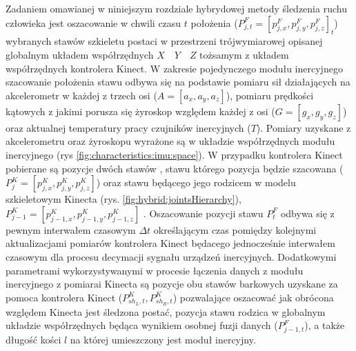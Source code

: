 Zadaniem omawianej w niniejszym rozdziale hybrydowej metody śledzenia ruchu człowieka jest oszacowanie w chwili czasu $t$ położenia ($P^F_{j,t} = [p^F_{j,x}, p^F_{j,y}, p^F_{j,z}]_t$)  wybranych stawów szkieletu postaci w przestrzeni trójwymiarowej opisanej globalnym układem współrzędnych $X\quad Y\quad Z$ tożsamym z układem współrzędnych kontrolera Kinect.
W zakresie pojedynczego modułu inercyjnego szacowanie położenia stawu odbywa się na podstawie pomiaru sił działających na akcelerometr w każdej z trzech osi 
($A = [a_x, a_y, a_z]$), pomiaru prędkości kątowych z jakimi porusza się żyroskop względem każdej z osi 
($G = [g_x, g_y, g_z]$) oraz aktualnej temperatury pracy czujników inercyjnych ($T$). Pomiary uzyskane z akcelerometru oraz żyroskopu wyrażone są w układzie współrzędnych modułu inercyjnego (rys \ref{fig:characteristics:imu:space}). W przypadku kontrolera Kinect pobierane są pozycje dwóch stawów 
, stawu którego pozycja będzie szacowana ($P^K_{j} = [p^K_{j,x}, p^K_{j,y}, p^K_{j,z}]$) oraz stawu będącego jego rodzicem w modelu szkieletowym Kinecta (rys. \ref{fig:hybrid:jointsHierarchy}), $P^K_{j-1} = [p^K_{j-1,x},p^K_{j-1,y}, p^K_{j-1,z}]$ 
. Oszacowanie pozycji stawu $P^F_t$ odbywa się z pewnym interwałem czasowym $\Delta t$ określającym czas pomiędzy kolejnymi aktualizacjami pomiarów kontrolera Kinect będacego jednocześnie interwałem czasowym dla procesu decymacji sygnału urządzeń inercyjnych. Dodatkowymi parametrami wykorzystywanymi w procesie łączenia danych z modułu inercyjnego z pomiarai Kinecta są pozycje obu stawów barkowych uzyskane za pomoca kontrolera Kinect ($P^K_{sh_L,t}, P^K_{sh_R,t}$) pozwalające oszacować jak obrócona względem Kinecta jest śledzona postać, pozycja stawu rodzica w globalnym układzie współrzędnych będąca wynikiem osobnej fuzji danych ($P^F_{j-1,t}$), a także długość kości $l$ na której umieszczony jest moduł inercyjny.
